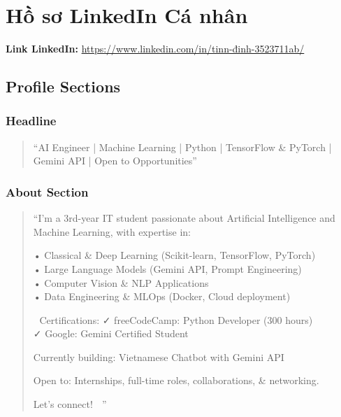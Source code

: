 \documentclass[12pt,a4paper]{article}
\begin{document}
\newpage


\section{Hồ sơ LinkedIn Cá nhân}

\textbf{Link LinkedIn:} \url{https://www.linkedin.com/in/tinn-đinh-3523711ab/}

\subsection{Profile Sections}

\subsubsection{Headline}
\begin{quote}
``AI Engineer | Machine Learning | Python | TensorFlow \& PyTorch | Gemini API | Open to Opportunities''
\end{quote}

\subsubsection{About Section}
\begin{quote}
``I'm a 3rd-year IT student passionate about Artificial Intelligence and Machine Learning, with expertise in:

• Classical \& Deep Learning (Scikit-learn, TensorFlow, PyTorch)\\
• Large Language Models (Gemini API, Prompt Engineering)\\
• Computer Vision \& NLP Applications\\
• Data Engineering \& MLOps (Docker, Cloud deployment)

📜 Certifications:
✓ freeCodeCamp: Python Developer (300 hours)\\
✓ Google: Gemini Certified Student

Currently building: Vietnamese Chatbot with Gemini API

Open to: Internships, full-time roles, collaborations, \& networking.

Let's connect! 🤝
''
\end{quote}
\end{document}

